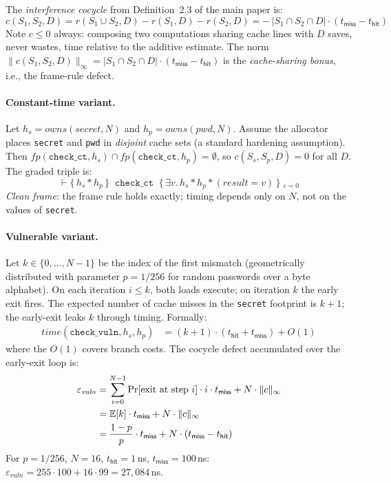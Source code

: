 The \emph{interference cocycle} from Definition~2.3 of the main paper is:
\begin{equation}
  c(S_1, S_2, D)
    = r(S_1 \cup S_2, D) - r(S_1, D) - r(S_2, D)
    = -\,|S_1 \cap S_2 \cap D| \cdot (t_\mathsf{miss} - t_\mathsf{hit})
  \label{eq:cocycle}
\end{equation}
Note $c \leq 0$ always: composing two computations sharing cache lines
with $D$ saves, never wastes, time relative to the additive estimate.
The norm $\|c(S_1,S_2,D)\|_\infty
= |S_1\cap S_2\cap D|\cdot(t_\mathsf{miss}-t_\mathsf{hit})$
is the \emph{cache-sharing bonus}, i.e., the frame-rule defect.

\paragraph{Constant-time variant.}
Let $h_s = \mathit{owns}(\mathit{secret}, N)$
and $h_p = \mathit{owns}(\mathit{pwd}, N)$.
Assume the allocator places \texttt{secret} and \texttt{pwd} in
\emph{disjoint} cache sets (a standard hardening assumption).
Then $\mathit{fp}(\mathtt{check\_ct},h_s) \cap
      \mathit{fp}(\mathtt{check\_ct},h_p) = \emptyset$, so
$c(S_s, S_p, D) = 0$ for all $D$.
The graded triple is:
\begin{equation}
  \vdash
  \bigl\{\,h_s * h_p\,\bigr\}\;\;
  \mathtt{check\_ct}
  \;\;\bigl\{\,\exists v.\, h_s * h_p * (\mathit{result}=v)\,\bigr\}
  \;_{\varepsilon=0}
  \label{eq:ct-triple}
\end{equation}
\emph{Clean frame}: the frame rule holds exactly; timing depends only
on $N$, not on the values of \texttt{secret}.

\paragraph{Vulnerable variant.}
Let $k \in \{0,\ldots,N-1\}$ be the index of the first mismatch
(geometrically distributed with parameter $p = 1/256$ for random
passwords over a byte alphabet).
On each iteration $i \leq k$, both loads execute; on iteration $k$
the early exit fires.
The expected number of cache misses in the \texttt{secret} footprint
is $k+1$; the early-exit leaks $k$ through timing.
Formally:
\begin{align}
  \mathit{time}(\mathtt{check\_vuln}, h_s, h_p)
    &= (k+1)\cdot(t_\mathsf{hit} + t_\mathsf{miss}) + O(1)
    \label{eq:vuln-time}
\end{align}
where the $O(1)$ covers branch costs.
The cocycle defect accumulated over the early-exit loop is:
\begin{align}
  \varepsilon_\mathit{vuln}
  &= \sum_{i=0}^{N-1}
     \Pr[\text{exit at step }i]\cdot i \cdot t_\mathsf{miss}
    + N\cdot\|c\|_\infty
  \notag\\
  &= \mathbb{E}[k]\cdot t_\mathsf{miss} + N\cdot\|c\|_\infty
  \notag\\
  &= \frac{1-p}{p}\cdot t_\mathsf{miss}
     + N\cdot(t_\mathsf{miss}-t_\mathsf{hit})
  \label{eq:defect}
\end{align}
For $p = 1/256$, $N = 16$, $t_\mathsf{hit}=1$\,ns,
$t_\mathsf{miss}=100$\,ns:
$\varepsilon_\mathit{vuln} = 255\cdot 100 + 16\cdot 99 = 27{,}084$\,ns.

